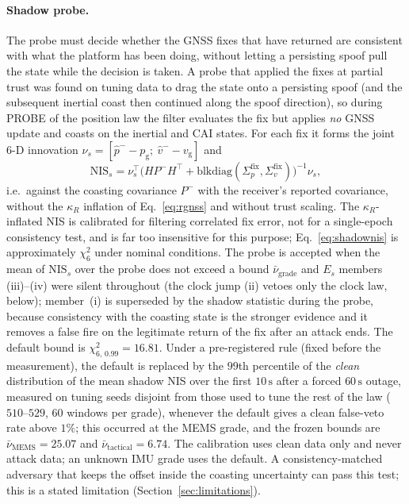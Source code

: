 \documentclass[journal]{IEEEtran}
\begin{document}
\paragraph{Shadow probe.}
The probe must decide whether the GNSS fixes that have returned are consistent with what the platform has
been doing, without letting a persisting spoof pull the state while the decision is taken. A probe that
applied the fixes at partial trust was found on tuning data to drag the state onto a persisting spoof (and the
subsequent inertial coast then continued along the spoof direction), so during PROBE of the position law the
filter evaluates the fix but applies \emph{no} GNSS update and coasts on the inertial and CAI states. For
each fix it forms the joint 6-D innovation $\nu_s = [\hat p^- - p_{\mathrm{g}};\ \hat v^- - v_{\mathrm{g}}]$
and
\begin{equation}
\mathrm{NIS}_{s} = \nu_s^{\top}\big(H P^{-} H^{\top} + \mathrm{blkdiag}(\Sigma_p^{\mathrm{fix}}, \Sigma_v^{\mathrm{fix}})\big)^{-1}\nu_s ,
\label{eq:shadownis}
\end{equation}
i.e.\ against the coasting covariance $P^{-}$ with the receiver's reported covariance, without the
$\kappa_R$ inflation of Eq.~\eqref{eq:rgnss} and without trust scaling. The $\kappa_R$-inflated NIS is
calibrated for filtering correlated fix error, not for a single-epoch consistency test, and is far too
insensitive for this purpose; Eq.~\eqref{eq:shadownis} is approximately $\chi^2_6$ under nominal conditions.
The probe is accepted when the mean of $\mathrm{NIS}_s$ over the probe does not exceed a bound
$\bar\nu_{\mathrm{grade}}$ and $E_s$ members (iii)--(iv) were silent throughout (the clock jump (ii) vetoes
only the clock law, below); member~(i) is superseded by the shadow statistic during the probe, because consistency with the coasting state is the stronger evidence and it
removes a false fire on the legitimate return of the fix after an attack ends. The default bound is
$\chi^2_{6,\,0.99} = 16.81$. Under a pre-registered rule (fixed before the measurement), the default is replaced
by the $99$th percentile of the \emph{clean} distribution of the mean shadow NIS over the first $10\,\mathrm{s}$
after a forced $60\,\mathrm{s}$ outage, measured on tuning seeds disjoint from those used to tune the rest of the
law ($510$--$529$, $60$ windows per grade), whenever the default gives a clean false-veto rate above $1\%$; this
occurred at the MEMS grade, and the frozen bounds are $\bar\nu_{\mathrm{MEMS}} = 25.07$ and
$\bar\nu_{\mathrm{tactical}} = 6.74$. The calibration uses clean data only and never attack data; an unknown IMU
grade uses the default. A consistency-matched adversary that keeps the offset inside the coasting uncertainty
can pass this test; this is a stated limitation (Section~\ref{sec:limitations}).
\end{document}
